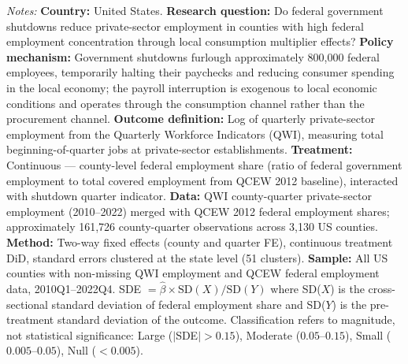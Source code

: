 \begin{table}[t]
\par\vspace{0.5em}\raggedright\small\textit{Notes:} \textbf{Country:} United States. \textbf{Research question:} Do federal government shutdowns reduce private-sector employment in counties with high federal employment concentration through local consumption multiplier effects? \textbf{Policy mechanism:} Government shutdowns furlough approximately 800,000 federal employees, temporarily halting their paychecks and reducing consumer spending in the local economy; the payroll interruption is exogenous to local economic conditions and operates through the consumption channel rather than the procurement channel. \textbf{Outcome definition:} Log of quarterly private-sector employment from the Quarterly Workforce Indicators (QWI), measuring total beginning-of-quarter jobs at private-sector establishments. \textbf{Treatment:} Continuous --- county-level federal employment share (ratio of federal government employment to total covered employment from QCEW 2012 baseline), interacted with shutdown quarter indicator. \textbf{Data:} QWI county-quarter private-sector employment (2010--2022) merged with QCEW 2012 federal employment shares; approximately 161,726 county-quarter observations across 3,130 US counties. \textbf{Method:} Two-way fixed effects (county and quarter FE), continuous treatment DiD, standard errors clustered at the state level (51 clusters). \textbf{Sample:} All US counties with non-missing QWI employment and QCEW federal employment data, 2010Q1--2022Q4. SDE $= \hat{\beta} \times \text{SD}(X) / \text{SD}(Y)$ where SD($X$) is the cross-sectional standard deviation of federal employment share and SD($Y$) is the pre-treatment standard deviation of the outcome. Classification refers to magnitude, not statistical significance: Large ($|$SDE$| > 0.15$), Moderate ($0.05$--$0.15$), Small ($0.005$--$0.05$), Null ($< 0.005$).
\end{table}
